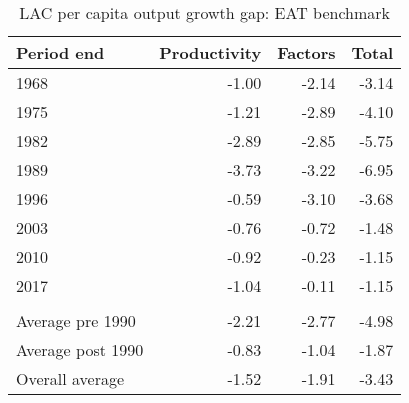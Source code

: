 \begin{table}[!h]

\caption{\label{tab:}LAC per capita output growth gap: EAT benchmark}
\centering
\begin{tabular}[t]{lrrr}
\toprule
Period end & Productivity & Factors & Total\\
\midrule
1968 & -1.00 & -2.14 & -3.14\\
1975 & -1.21 & -2.89 & -4.10\\
1982 & -2.89 & -2.85 & -5.75\\
1989 & -3.73 & -3.22 & -6.95\\
1996 & -0.59 & -3.10 & -3.68\\
2003 & -0.76 & -0.72 & -1.48\\
2010 & -0.92 & -0.23 & -1.15\\
2017 & -1.04 & -0.11 & -1.15\\
\addlinespace[0.3em]
\multicolumn{4}{l}{\textbf{Averages}}\\
\hspace{1em}Average pre 1990 & -2.21 & -2.77 & -4.98\\
\hspace{1em}Average post 1990 & -0.83 & -1.04 & -1.87\\
\hspace{1em}Overall average & -1.52 & -1.91 & -3.43\\
\bottomrule
\end{tabular}
\end{table}